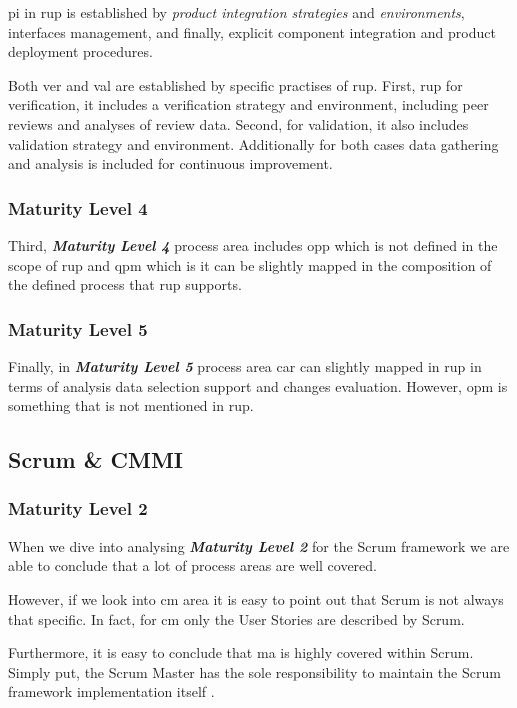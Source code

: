 \ac{pi} in \ac{rup} is established by \textit{product integration strategies} and \textit{environments}, interfaces management, and finally, explicit component integration and product deployment procedures.

Both \ac{ver} and \ac{val} are established by specific practises of \ac{rup}. First, \ac{rup} for verification, it includes a verification strategy and environment, including peer reviews and analyses of review data. Second, for validation, it also includes validation strategy and environment. Additionally for both cases data gathering and analysis is included for continuous improvement.

\subsubsection{Maturity Level 4}
Third, \textbf{\textit{Maturity Level 4}} process area includes \ac{opp} which is not defined in the scope of \ac{rup} and \ac{qpm} which is it can be slightly mapped in the composition of the defined process that \ac{rup} supports.

\subsubsection{Maturity Level 5}
Finally, in \textbf{\textit{Maturity Level 5}} process area \ac{car} can slightly mapped in \ac{rup} in terms of analysis data selection support and changes evaluation. 
However, \ac{opm} is something that is not mentioned in \ac{rup}.

\subsection{Scrum \& CMMI}
\subsubsection{Maturity Level 2}
When we dive into analysing \textbf{\textit{Maturity Level 2}} for the Scrum framework we are able to conclude that a lot of process areas are well covered. 

However, if we look into \ac{cm} area it is easy to point out that Scrum is not always that specific. In fact, for \ac{cm} only the User Stories are described by Scrum. 

Furthermore, it is easy to conclude that \ac{ma} is highly covered within Scrum. Simply put, the Scrum Master has the sole responsibility to maintain the Scrum framework implementation itself \citep{schwaber2011scrum}. 

